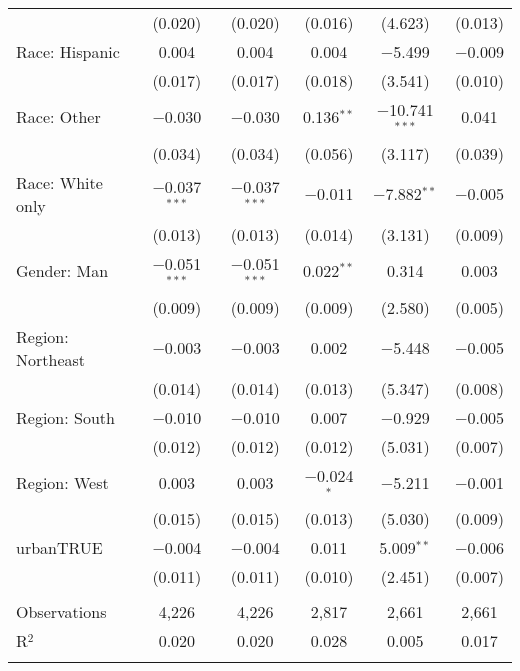 \begin{tabular}{@{\extracolsep{5pt}}lccccc}
  & (0.020) & (0.020) & (0.016) & (4.623) & (0.013) \\ 
  Race: Hispanic & 0.004 & 0.004 & 0.004 & $-$5.499 & $-$0.009 \\ 
  & (0.017) & (0.017) & (0.018) & (3.541) & (0.010) \\ 
  Race: Other & $-$0.030 & $-$0.030 & 0.136$^{**}$ & $-$10.741$^{***}$ & 0.041 \\ 
  & (0.034) & (0.034) & (0.056) & (3.117) & (0.039) \\ 
  Race: White only & $-$0.037$^{***}$ & $-$0.037$^{***}$ & $-$0.011 & $-$7.882$^{**}$ & $-$0.005 \\ 
  & (0.013) & (0.013) & (0.014) & (3.131) & (0.009) \\ 
  Gender: Man & $-$0.051$^{***}$ & $-$0.051$^{***}$ & 0.022$^{**}$ & 0.314 & 0.003 \\ 
  & (0.009) & (0.009) & (0.009) & (2.580) & (0.005) \\ 
  Region: Northeast & $-$0.003 & $-$0.003 & 0.002 & $-$5.448 & $-$0.005 \\ 
  & (0.014) & (0.014) & (0.013) & (5.347) & (0.008) \\ 
  Region: South & $-$0.010 & $-$0.010 & 0.007 & $-$0.929 & $-$0.005 \\ 
  & (0.012) & (0.012) & (0.012) & (5.031) & (0.007) \\ 
  Region: West & 0.003 & 0.003 & $-$0.024$^{*}$ & $-$5.211 & $-$0.001 \\ 
  & (0.015) & (0.015) & (0.013) & (5.030) & (0.009) \\ 
  urbanTRUE & $-$0.004 & $-$0.004 & 0.011 & 5.009$^{**}$ & $-$0.006 \\ 
  & (0.011) & (0.011) & (0.010) & (2.451) & (0.007) \\ 
 \hline \\[-1.8ex] 

Observations & 4,226 & 4,226 & 2,817 & 2,661 & 2,661 \\ 
R$^{2}$ & 0.020 & 0.020 & 0.028 & 0.005 & 0.017 \\ 
\hline 
\hline \\[-1.8ex] 
\end{tabular} 